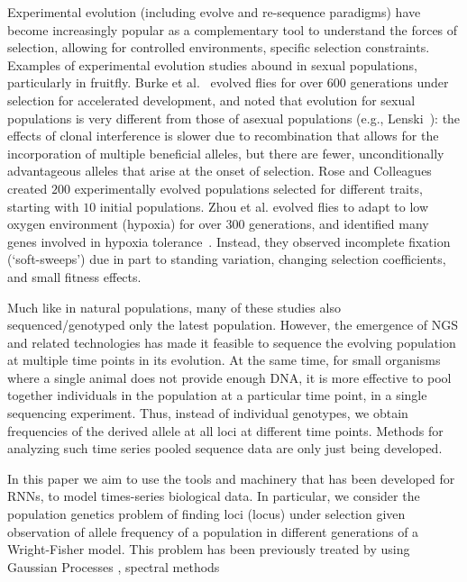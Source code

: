 Experimental evolution (including evolve and re-sequence paradigms)
have become increasingly popular as a complementary tool to understand
the forces of selection, allowing for controlled environments,
specific selection constraints. Examples of experimental evolution
studies abound in sexual populations, particularly in fruitfly. Burke
et al.~\cite{Burke2010} evolved flies for over $600$ generations under
selection for accelerated development, and noted that evolution for
sexual populations is very different from those of asexual populations
(e.g., Lenski~\cite{}): the effects of clonal interference is slower
due to recombination that allows for the incorporation of multiple
beneficial alleles, but there are fewer, unconditionally advantageous
alleles that arise at the onset of selection. Rose and
Colleagues~\cite{Rose} created $200$ experimentally evolved
populations selected for different traits, starting with $10$ initial
populations. Zhou et al. evolved flies to adapt to low oxygen
environment (hypoxia) for over $300$ generations, and identified many
genes involved in hypoxia tolerance~\cite{}.  Instead, they observed
incomplete fixation (`soft-sweeps') due in part to standing variation,
changing selection coefficients, and small fitness effects.

Much like in natural populations, many of these studies also
sequenced/genotyped only the latest population. However, the emergence
of NGS and related technologies has made it feasible to sequence the
evolving population at multiple time points in its evolution. At the
same time, for small organisms where a single animal does not provide
enough DNA, it is more effective to pool together individuals in the
population at a particular time point, in a single sequencing
experiment. Thus, instead of individual genotypes, we obtain
frequencies of the derived allele at all loci at different time
points. Methods for analyzing such time series pooled sequence data
are only just being developed.

In this paper we aim to use the tools and machinery that has been
developed for RNNs, to model times-series biological data. In
particular, we consider the population genetics problem of finding
loci (locus) under selection given observation of allele frequency of
a population in different generations of a Wright-Fisher model. This
problem has been previously treated by using Gaussian Processes
\cite{Terhorst15}, spectral methods \cite{Song14}



